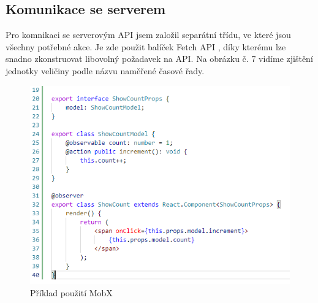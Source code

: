 \documentclass[FM,BP]{tulthesis}
\begin{document}
        \subsection{Komunikace se serverem}
            Pro komnikaci se serverovým API jsem založil separátní třídu, ve které jsou všechny potřebné akce.
            Je zde použit balíček Fetch API \cite{29}, díky kterému lze snadno zkonstruovat libovolný požadavek na API.
            Na obrázku č. 7 vidíme zjištění jednotky veličiny podle názvu naměřené časové řady.
            \begin{figure}[h]
                \centering
                \includegraphics[scale=1]{pic/mobXexample.PNG}
                \caption{Příklad použití MobX} \label{Obrázek č. 6}
            \end{figure}
\end{document}
